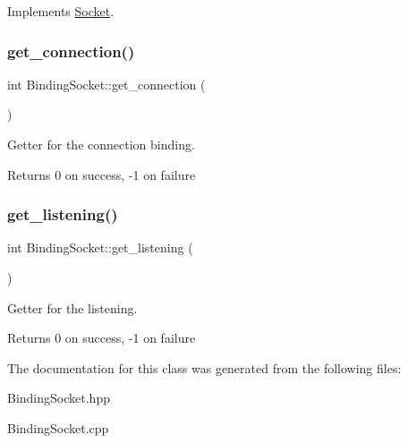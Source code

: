 Implements \hyperlink{classSocket_a2483ca0900b0d55cfeb4b6cf5724c1e7}{Socket}.

\mbox{\label{classBindingSocket_acaf64a54e51eea07f5f7268b805ab3d0}} 
\subsubsection{\texorpdfstring{get\+\_\+connection()}{get\_connection()}}
{\footnotesize\ttfamily int Binding\+Socket\+::get\+\_\+connection (\begin{DoxyParamCaption}{ }\end{DoxyParamCaption})}



Getter for the connection binding. 

\begin{DoxyReturn}{Returns}
0 on success, -\/1 on failure 
\end{DoxyReturn}
\mbox{\label{classBindingSocket_a562609b198ba3db277549ae4d465d1c2}} 
\subsubsection{\texorpdfstring{get\+\_\+listening()}{get\_listening()}}
{\footnotesize\ttfamily int Binding\+Socket\+::get\+\_\+listening (\begin{DoxyParamCaption}{ }\end{DoxyParamCaption})}



Getter for the listening. 

\begin{DoxyReturn}{Returns}
0 on success, -\/1 on failure 
\end{DoxyReturn}


The documentation for this class was generated from the following files\+:\begin{DoxyCompactItemize}
\item 
Binding\+Socket.\+hpp\item 
Binding\+Socket.\+cpp\end{DoxyCompactItemize}
